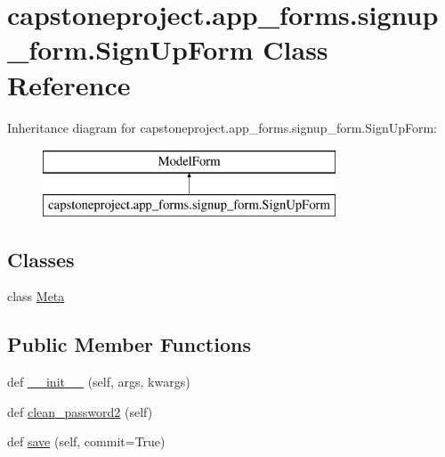 \hypertarget{classcapstoneproject_1_1app__forms_1_1signup__form_1_1_sign_up_form}{}\section{capstoneproject.\+app\+\_\+forms.\+signup\+\_\+form.\+Sign\+Up\+Form Class Reference}
\label{classcapstoneproject_1_1app__forms_1_1signup__form_1_1_sign_up_form}
Inheritance diagram for capstoneproject.\+app\+\_\+forms.\+signup\+\_\+form.\+Sign\+Up\+Form\+:\begin{figure}[H]
\begin{center}
\leavevmode
\includegraphics[height=2.000000cm]{classcapstoneproject_1_1app__forms_1_1signup__form_1_1_sign_up_form}
\end{center}
\end{figure}
\subsection*{Classes}
\begin{DoxyCompactItemize}
\item 
class \mbox{\hyperlink{classcapstoneproject_1_1app__forms_1_1signup__form_1_1_sign_up_form_1_1_meta}{Meta}}
\end{DoxyCompactItemize}
\subsection*{Public Member Functions}
\begin{DoxyCompactItemize}
\item 
def \mbox{\hyperlink{classcapstoneproject_1_1app__forms_1_1signup__form_1_1_sign_up_form_af4a56ce83a41432e702f9ad60f0254a5}{\+\_\+\+\_\+init\+\_\+\+\_\+}} (self, args, kwargs)
\item 
def \mbox{\hyperlink{classcapstoneproject_1_1app__forms_1_1signup__form_1_1_sign_up_form_ace45969945cdf655e4d95de522c51bbd}{clean\+\_\+password2}} (self)
\item 
def \mbox{\hyperlink{classcapstoneproject_1_1app__forms_1_1signup__form_1_1_sign_up_form_aebbe9f53bbd5b9093bc862739b254b94}{save}} (self, commit=True)
\end{DoxyCompactItemize}
